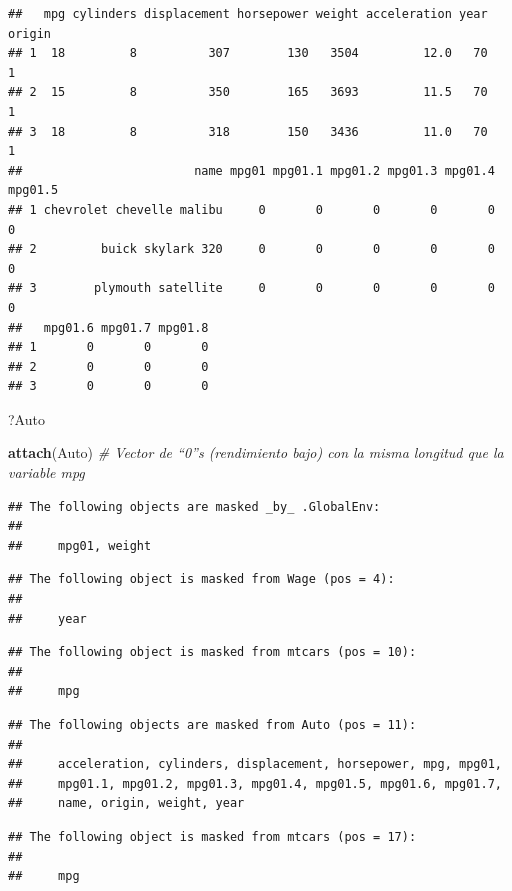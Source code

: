 \documentclass[]{book}
\newenvironment{Shaded}{\begin{snugshade}}{\end{snugshade}}
\newcommand{\KeywordTok}[1]{\textcolor[rgb]{0.13,0.29,0.53}{\textbf{#1}}}
\newcommand{\CommentTok}[1]{\textcolor[rgb]{0.56,0.35,0.01}{\textit{#1}}}
\newcommand{\NormalTok}[1]{#1}
\begin{document}
\begin{verbatim}
##   mpg cylinders displacement horsepower weight acceleration year origin
## 1  18         8          307        130   3504         12.0   70      1
## 2  15         8          350        165   3693         11.5   70      1
## 3  18         8          318        150   3436         11.0   70      1
##                        name mpg01 mpg01.1 mpg01.2 mpg01.3 mpg01.4 mpg01.5
## 1 chevrolet chevelle malibu     0       0       0       0       0       0
## 2         buick skylark 320     0       0       0       0       0       0
## 3        plymouth satellite     0       0       0       0       0       0
##   mpg01.6 mpg01.7 mpg01.8
## 1       0       0       0
## 2       0       0       0
## 3       0       0       0
\end{verbatim}

\begin{Shaded}
\begin{Highlighting}[]
\NormalTok{?Auto}

\KeywordTok{attach}\NormalTok{(Auto) }\CommentTok{# Vector de “0”s (rendimiento bajo) con la misma longitud que la variable mpg }
\end{Highlighting}
\end{Shaded}

\begin{verbatim}
## The following objects are masked _by_ .GlobalEnv:
## 
##     mpg01, weight
\end{verbatim}

\begin{verbatim}
## The following object is masked from Wage (pos = 4):
## 
##     year
\end{verbatim}

\begin{verbatim}
## The following object is masked from mtcars (pos = 10):
## 
##     mpg
\end{verbatim}

\begin{verbatim}
## The following objects are masked from Auto (pos = 11):
## 
##     acceleration, cylinders, displacement, horsepower, mpg, mpg01,
##     mpg01.1, mpg01.2, mpg01.3, mpg01.4, mpg01.5, mpg01.6, mpg01.7,
##     name, origin, weight, year
\end{verbatim}

\begin{verbatim}
## The following object is masked from mtcars (pos = 17):
## 
##     mpg
\end{verbatim}
\end{document}
